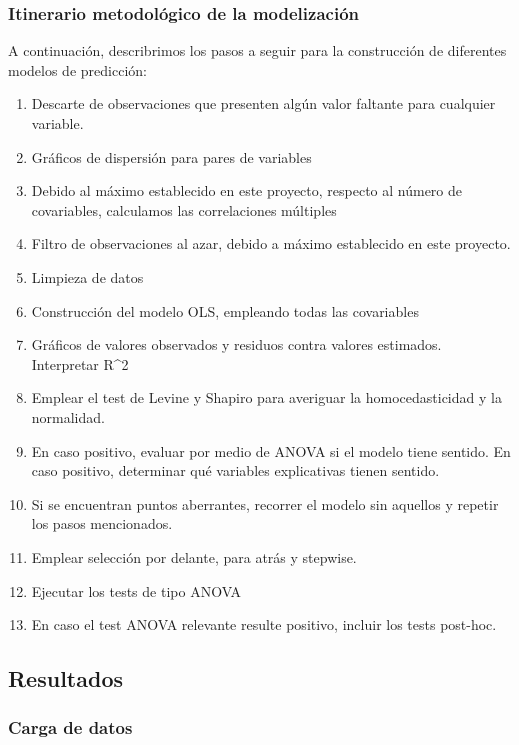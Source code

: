\documentclass[
]{article}
\begin{document}
\subsubsection{Itinerario metodológico de la
modelización}\label{itinerario-metodoluxf3gico-de-la-modelizaciuxf3n}

A continuación, describrimos los pasos a seguir para la construcción de
diferentes modelos de predicción:

\begin{enumerate}
\def\labelenumi{\arabic{enumi}.}
\item
  Descarte de observaciones que presenten algún valor faltante para
  cualquier variable.
\item
  Gráficos de dispersión para pares de variables
\item
  Debido al máximo establecido en este proyecto, respecto al número de
  covariables, calculamos las correlaciones múltiples
\item
  Filtro de observaciones al azar, debido a máximo establecido en este
  proyecto.
\item
  Limpieza de datos
\item
  Construcción del modelo OLS, empleando todas las covariables
\item
  Gráficos de valores observados y residuos contra valores estimados.
  Interpretar R\^{}2
\item
  Emplear el test de Levine y Shapiro para averiguar la homocedasticidad
  y la normalidad.
\item
  En caso positivo, evaluar por medio de ANOVA si el modelo tiene
  sentido. En caso positivo, determinar qué variables explicativas
  tienen sentido.
\item
  Si se encuentran puntos aberrantes, recorrer el modelo sin aquellos y
  repetir los pasos mencionados.
\item
  Emplear selección por delante, para atrás y stepwise.
\item
  Ejecutar los tests de tipo ANOVA
\item
  En caso el test ANOVA relevante resulte positivo, incluir los tests
  post-hoc.
\end{enumerate}

\subsection{Resultados}\label{resultados}

\subsubsection{Carga de datos}\label{carga-de-datos}
\end{document}
